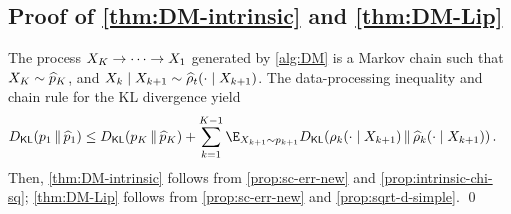 \subsection{Proof of \cref{thm:DM-intrinsic} and \cref{thm:DM-Lip}}

The process $X_{K}\to\cdots\to X_{1}$ generated by \cref{alg:DM} is a Markov chain such that $X_{K}\sim \widehat{p}_K$, and $X_{k}\mid X_{k+1}\sim \widehat{\rho}_t(\cdot\mid X_{k+1})$.
The data-processing inequality and chain rule for the KL divergence yield
\begin{align*}
    \Dkl{p_1}{\wh p_1}
    &\leq \Dkl{p_K}{\wh p_K} + \sum_{k=1}^{K-1} \E_{\xr{k+1} \sim p_{k+1}}\Dkl{\rho_k(\cdot \mid \xr{k+1})}{\wh\rho_k(\cdot \mid \xr{k+1})}\,.
\end{align*}
Then, \cref{thm:DM-intrinsic} follows from \cref{prop:sc-err-new} and \cref{prop:intrinsic-chi-sq}; \cref{thm:DM-Lip} follows from \cref{prop:sc-err-new} and \cref{prop:sqrt-d-simple}.
\qed




\subsection{}



